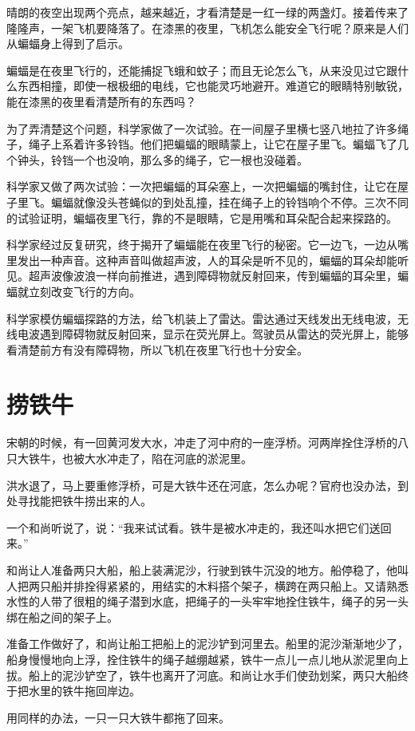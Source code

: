 \documentclass[12pt,UTF-8,openany]{ctexbook}
\begin{document}
\begin{large}
    
    晴朗的夜空出现两个亮点，越来越近，才看清楚是一红一绿的两盏灯。接着传来了隆隆声，一架飞机要降落了。在漆黑的夜里，飞机怎么能安全飞行呢？原来是人们从蝙蝠身上得到了启示。
    
    蝙蝠是在夜里飞行的，还能捕捉飞蛾和蚊子；而且无论怎么飞，从来没见过它跟什么东西相撞，即使一根极细的电线，它也能灵巧地避开。难道它的眼睛特别敏锐，能在漆黑的夜里看清楚所有的东西吗？
    
    为了弄清楚这个问题，科学家做了一次试验。在一间屋子里横七竖八地拉了许多绳子，绳子上系着许多铃铛。他们把蝙蝠的眼睛蒙上，让它在屋子里飞。蝙蝠飞了几个钟头，铃铛一个也没响，那么多的绳子，它一根也没碰着。
    
    科学家又做了两次试验：一次把蝙蝠的耳朵塞上，一次把蝙蝠的嘴封住，让它在屋子里飞。蝙蝠就像没头苍蝇似的到处乱撞，挂在绳子上的铃铛响个不停。三次不同的试验证明，蝙蝠夜里飞行，靠的不是眼睛，它是用嘴和耳朵配合起来探路的。
    
    科学家经过反复研究，终于揭开了蝙蝠能在夜里飞行的秘密。它一边飞，一边从嘴里发出一种声音。这种声音叫做超声波，人的耳朵是听不见的，蝙蝠的耳朵却能听见。超声波像波浪一样向前推进，遇到障碍物就反射回来，传到蝙蝠的耳朵里，蝙蝠就立刻改变飞行的方向。
    
    科学家模仿蝙蝠探路的方法，给飞机装上了雷达。雷达通过天线发出无线电波，无线电波遇到障碍物就反射回来，显示在荧光屏上。驾驶员从雷达的荧光屏上，能够看清楚前方有没有障碍物，所以飞机在夜里飞行也十分安全。
    
\end{large}



\chapter{捞铁牛}

\begin{large}
    
    宋朝的时候，有一回黄河发大水，冲走了河中府的一座浮桥。河两岸拴住浮桥的八只大铁牛，也被大水冲走了，陷在河底的淤泥里。
    
    洪水退了，马上要重修浮桥，可是大铁牛还在河底，怎么办呢？官府也没办法，到处寻找能把铁牛捞出来的人。
    
    一个和尚听说了，说：“我来试试看。铁牛是被水冲走的，我还叫水把它们送回来。”
    
    和尚让人准备两只大船，船上装满泥沙，行驶到铁牛沉没的地方。船停稳了，他叫人把两只船并排拴得紧紧的，用结实的木料搭个架子，横跨在两只船上。又请熟悉水性的人带了很粗的绳子潜到水底，把绳子的一头牢牢地拴住铁牛，绳子的另一头绑在船之间的架子上。
    
    准备工作做好了，和尚让船工把船上的泥沙铲到河里去。船里的泥沙渐渐地少了，船身慢慢地向上浮，拴住铁牛的绳子越绷越紧，铁牛一点儿一点儿地从淤泥里向上拔。船上的泥沙铲空了，铁牛也离开了河底。和尚让水手们使劲划桨，两只大船终于把水里的铁牛拖回岸边。
    
    用同样的办法，一只一只大铁牛都拖了回来。
    
\end{large}
\end{document}

